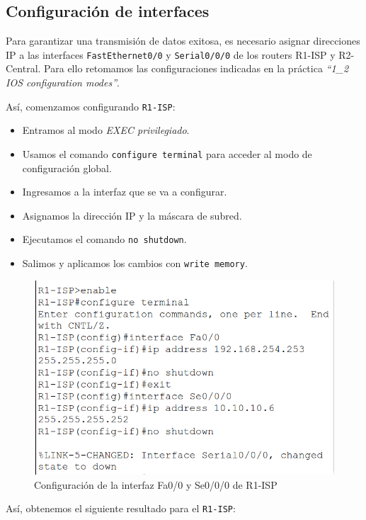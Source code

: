 \documentclass[a4paper,11pt]{article}
\begin{document}
\subsection{Configuración de interfaces}
Para garantizar una transmisión de datos exitosa, es necesario asignar
direcciones IP a las interfaces \texttt{FastEthernet0/0} y \texttt{Serial0/0/0}
de los routers R1-ISP y R2-Central. Para ello retomamos las configuraciones
indicadas en la práctica \textit{“1\_2 IOS configuration modes”}.
\vspace{0.2cm}

Así, comenzamos configurando \texttt{R1-ISP}:

\begin{itemize}
    \item Entramos al modo \textit{EXEC privilegiado}.
    \item Usamos el comando \texttt{configure terminal} para acceder al modo de
          configuración global.
    \item Ingresamos a la interfaz que se va a configurar.
    \item Asignamos la dirección IP y la máscara de subred.
    \item Ejecutamos el comando \texttt{no shutdown}.
    \item Salimos y aplicamos los cambios con \texttt{write memory}.
\end{itemize}

\begin{figure}[h]
    \includegraphics[width=1\textwidth]{images/ip_r1.png}
    \caption{Configuración de la interfaz Fa0/0 y Se0/0/0 de R1-ISP}
\end{figure}

\newpage
Así, obtenemos el siguiente resultado para el \texttt{R1-ISP}:
\end{document}
